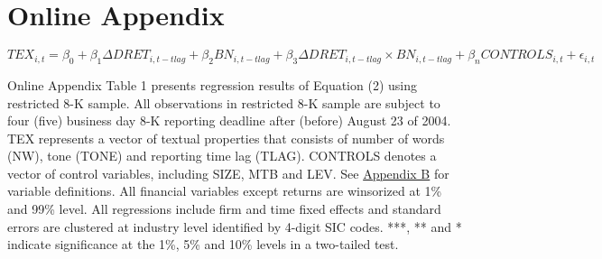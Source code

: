 \section*{Online Appendix}

%
%



\setcounter{equation}{1}
\begin{equation}
TEX_{i,t}=\beta_0+\beta_1\Delta DRET_{i,t-tlag}+\beta_2BN_{i,t-tlag}+\beta_3\Delta DRET_{i,t-tlag}\times BN_{i,t-tlag}+\beta_nCONTROLS_{i,t}+\epsilon_{i,t}
\end{equation}
\newline

Online Appendix Table 1 presents regression results of Equation (2) using restricted 8-K sample. All observations in restricted 8-K sample are subject to four (five) business day 8-K reporting deadline after (before) August 23 of 2004. TEX represents a vector of textual properties that consists of number of words (NW), tone (TONE) and reporting time lag (TLAG). CONTROLS denotes a vector of control variables, including SIZE, MTB and LEV. See \hyperref[appb]{Appendix B} for variable definitions. All financial variables except returns are winsorized at 1\% and 99\% level. All regressions include firm and time fixed effects and standard errors are clustered at industry level identified by 4-digit SIC codes. ***, ** and * indicate significance at the 1\%, 5\% and 10\% levels in a two-tailed test.

